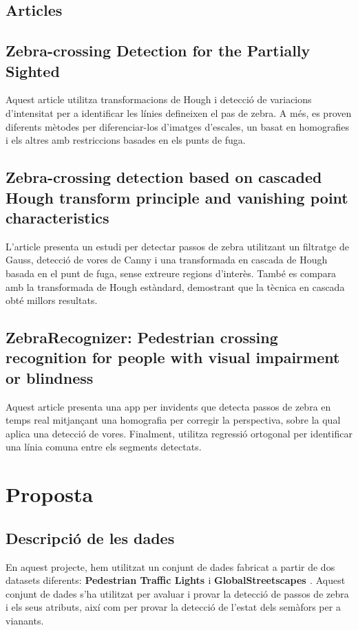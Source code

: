 \documentclass[10pt,a4paper,twocolumn,twoside]{article}
\begin{document}
\subsection{Articles}\label{sec:articles}
\subsection*{Zebra-crossing Detection for the Partially Sighted \cite{ZebraPartiallySighted}}
Aquest article utilitza transformacions de Hough i detecció de variacions d'intensitat per a identificar les línies defineixen el pas de zebra. A més, es proven diferents mètodes per diferenciar-los d'imatges d'escales, un basat en homografies i els altres amb restriccions basades en els punts de fuga.

\subsection*{Zebra-crossing detection based on cascaded Hough transform principle and vanishing point characteristics \cite{CascadedHough}}

L'article presenta un estudi per detectar passos de zebra utilitzant un filtratge de Gauss, detecció de vores de Canny i una transformada en cascada de Hough basada en el punt de fuga, sense extreure regions d'interès. També es compara amb la transformada de Hough estàndard, demostrant que la tècnica en cascada obté millors resultats.

\subsection*{ZebraRecognizer: Pedestrian crossing recognition for people with visual impairment or blindness \cite{RobustPedestrian}}
Aquest article presenta una app per invidents que detecta passos de zebra en temps real mitjançant una homografia per corregir la perspectiva, sobre la qual aplica una detecció de vores. Finalment, utilitza regressió ortogonal per identificar una línia comuna entre els segments detectats.

\section{Proposta}

\subsection{Descripció de les dades}
En aquest projecte, hem utilitzat un conjunt de dades fabricat a partir de dos datasets diferents: \textbf{Pedestrian Traffic Lights \cite{ImVisible}} i \textbf{GlobalStreetscapes \cite{GlobalStreetscapes}}.
Aquest conjunt de dades s’ha utilitzat per avaluar i provar la detecció de passos de zebra i els seus atributs, així com per provar la detecció de l’estat dels semàfors per a vianants.
\end{document}
